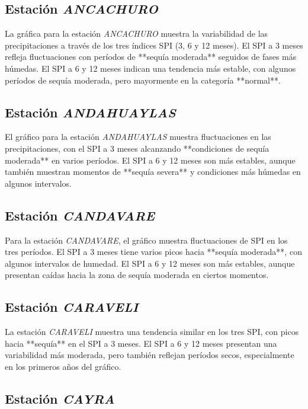 \subsection*{Estación \textit{ANCACHURO}}

La gráfica para la estación \textit{ANCACHURO} muestra la variabilidad de las precipitaciones a través de los tres índices SPI (3, 6 y 12 meses). El SPI a 3 meses refleja fluctuaciones con períodos de **sequía moderada** seguidos de fases más húmedas. El SPI a 6 y 12 meses indican una tendencia más estable, con algunos períodos de sequía moderada, pero mayormente en la categoría **normal**.

\subsection*{Estación \textit{ANDAHUAYLAS}}

El gráfico para la estación \textit{ANDAHUAYLAS} muestra fluctuaciones en las precipitaciones, con el SPI a 3 meses alcanzando **condiciones de sequía moderada** en varios períodos. El SPI a 6 y 12 meses son más estables, aunque también muestran momentos de **sequía severa** y condiciones más húmedas en algunos intervalos.

\subsection*{Estación \textit{CANDAVARE}}

Para la estación \textit{CANDAVARE}, el gráfico muestra fluctuaciones de SPI en los tres períodos. El SPI a 3 meses tiene varios picos hacia **sequía moderada**, con algunos intervalos de humedad. El SPI a 6 y 12 meses son más estables, aunque presentan caídas hacia la zona de sequía moderada en ciertos momentos.

\subsection*{Estación \textit{CARAVELI}}

La estación \textit{CARAVELI} muestra una tendencia similar en los tres SPI, con picos hacia **sequía** en el SPI a 3 meses. El SPI a 6 y 12 meses presentan una variabilidad más moderada, pero también reflejan períodos secos, especialmente en los primeros años del gráfico.

\subsection*{Estación \textit{CAYRA}}

